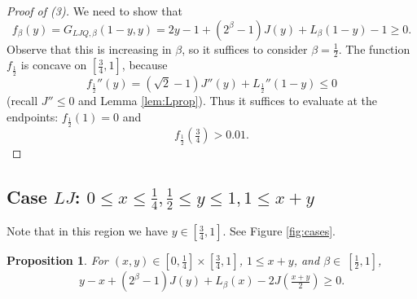\documentclass[12pt]{amsart}
\theoremstyle{plain}
\newtheorem{prop}[thm]{Proposition}
\theoremstyle{definition}
\theoremstyle{remark}
\numberwithin{equation}{section}
\begin{document}
\begin{proof}[Proof of (3)]
We need to show that 
\[f_\beta(y)=G_{LJQ,\beta}(1-y,y) = 2y-1+(2^\beta-1) J(y)+L_\beta(1-y)-1\ge 0.\]
Observe that this is increasing in $\beta$, so it suffices to consider $\beta=\frac12$.
The function $f_{\frac12}$ is concave on $[\tfrac34,1]$, because
\[f_{\frac12}''(y)= (\sqrt{2}-1) J''(y)+L_{\frac12}''(1-y)\le 0\]
(recall $J''\leq 0$ and Lemma \ref{lem:Lprop}). 
Thus it suffices to evaluate at the endpoints:  $f_\frac12(1)=0$ and
\begin{equation}
f_\frac12 (\tfrac{3}{4}) > 0.01.
\end{equation}
\end{proof}

\subsection{\texorpdfstring{Case $LJ$: $0 \leq x \leq \tfrac{1}{4}, \tfrac{1}{2}\leq y\leq 1, 1\leq x+y$}{Case LJ}}
\label{sec:caseLJ}
Note that in this region we have $y\in [\tfrac{3}{4},1]$. See Figure \ref{fig:cases}.
\begin{prop}
    For $(x,y)\in [0,\tfrac{1}{4}]\times [\tfrac{3}{4},1]$, $1\leq  {x+y}$,  and  $\beta\in~[\tfrac{1}{2},1]$,  
    \[y-x + (2^\beta-1) J(y) + L_\beta(x) -2J(\tfrac{x+y}{2})\geq 0.\]
\end{prop}
\end{document}

